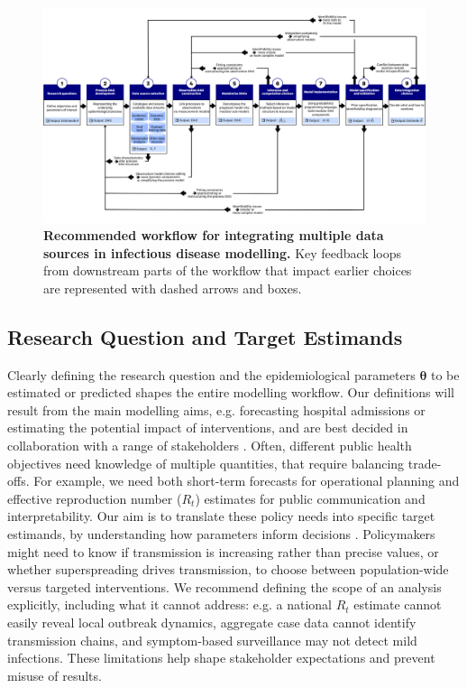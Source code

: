 \documentclass{article}
\begin{document}
\begin{landscape}
\begin{figure}[htbp]
    \centering
    \includegraphics[width = 1.4 \textwidth]{figures/Abbott et al figure 2.png}
    \caption{\textbf{Recommended workflow for integrating multiple data sources in infectious disease modelling.} Key feedback loops from downstream parts of the workflow that impact earlier choices are represented with dashed arrows and boxes.}
    \label{fig:workflow}
\end{figure}
\end{landscape}

\subsection{Research Question and Target Estimands} \label{sec:research-question}

Clearly defining the research question and the epidemiological parameters $\boldsymbol{\theta}$ to be estimated or predicted shapes the entire modelling workflow. Our definitions will result from the main modelling aims, e.g. forecasting hospital admissions or estimating the potential impact of interventions, and are best decided in collaboration with a range of stakeholders \citep{marshall2024when}.
Often, different public health objectives need knowledge of multiple quantities, that require balancing trade-offs. For example, we need both short-term forecasts for operational planning and effective reproduction number ($R_t$) estimates for public communication and interpretability. Our aim is to translate these policy needs into specific target estimands, by understanding how parameters inform decisions \citep{nicholson2022interoperability, who-mosaic-2023}. Policymakers might need to know if transmission is increasing rather than precise values, or whether superspreading drives transmission, to choose between population-wide versus targeted interventions. We recommend defining the scope of an analysis explicitly, including what it cannot address: e.g. a national $R_t$ estimate cannot easily reveal local outbreak dynamics, aggregate case data cannot identify transmission chains, and symptom-based surveillance may not detect mild infections.
These limitations help shape stakeholder expectations and prevent misuse of results.
\end{document}
